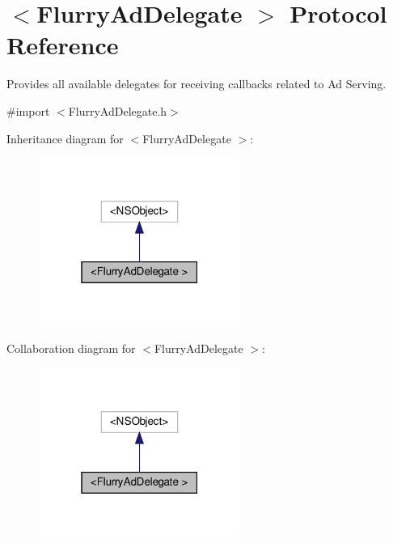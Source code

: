 \hypertarget{protocolFlurryAdDelegate_01-p}{}\section{$<$Flurry\+Ad\+Delegate $>$ Protocol Reference}
\label{protocolFlurryAdDelegate_01-p}


Provides all available delegates for receiving callbacks related to Ad Serving.  




{\ttfamily \#import $<$Flurry\+Ad\+Delegate.\+h$>$}



Inheritance diagram for $<$Flurry\+Ad\+Delegate $>$\+:
\nopagebreak
\begin{figure}[H]
\begin{center}
\leavevmode
\includegraphics[width=187pt]{protocolFlurryAdDelegate_01-p__inherit__graph}
\end{center}
\end{figure}


Collaboration diagram for $<$Flurry\+Ad\+Delegate $>$\+:
\nopagebreak
\begin{figure}[H]
\begin{center}
\leavevmode
\includegraphics[width=187pt]{protocolFlurryAdDelegate_01-p__coll__graph}
\end{center}
\end{figure}

